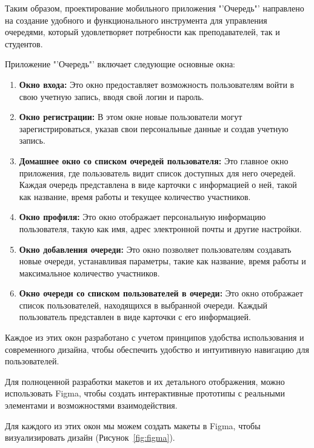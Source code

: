 Таким образом, проектирование мобильного приложения "'Очередь"' направлено
на создание удобного и функционального инструмента для управления очередями,
который удовлетворяет потребности как преподавателей, так и студентов.

\label{sc:designing:ui}

Приложение "'Очередь"' включает следующие основные окна:

\begin{enumerate}
    \item \textbf{Окно входа:} Это окно предоставляет возможность
		пользователям войти в свою учетную запись, вводя свой логин и пароль.
    \item \textbf{Окно регистрации:} В этом окне новые пользователи могут
		зарегистрироваться, указав свои персональные данные
		и создав учетную запись.
    \item \textbf{Домашнее окно со списком очередей пользователя:}
		Это главное окно приложения, где пользователь видит список доступных
		для него очередей. Каждая очередь представлена в виде карточки
		с информацией о ней, такой как название,
		время работы и текущее количество участников.
    \item \textbf{Окно профиля:} Это окно отображает персональную информацию
		пользователя, такую как имя,
		адрес электронной почты и другие настройки.
    \item \textbf{Окно добавления очереди:} Это окно позволяет пользователям
		создавать новые очереди, устанавливая параметры,
		такие как название, время работы и максимальное количество участников.
    \item \textbf{Окно очереди со списком пользователей в очереди:}
		Это окно отображает список пользователей, находящихся
		в выбранной очереди. Каждый пользователь представлен в виде карточки
		с его информацией.
\end{enumerate}

Каждое из этих окон разработано с учетом принципов удобства использования
и современного дизайна, чтобы обеспечить удобство и интуитивную навигацию
для пользователей.\par
Для полноценной разработки макетов и их детального отображения,
можно использовать Figma, чтобы создать интерактивные прототипы
с реальными элементами и возможностями взаимодействия.\par
Для каждого из этих окон мы можем создать макеты в Figma,
чтобы визуализировать дизайн (Рисунок~\ref{fig:figma}).

